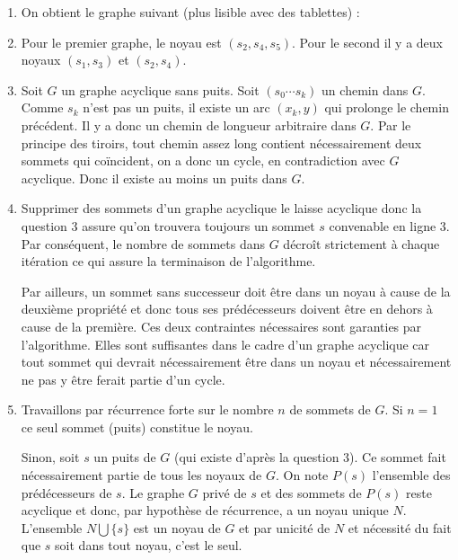 \documentclass{ccinp}
\begin{document}
\begin{enumerate}
\item On obtient le graphe suivant (plus lisible avec des tablettes) : 
\begin{center}
\end{center}

\item Pour le premier graphe, le noyau est $(s_2,s_4,s_5)$. Pour le second il y a deux noyaux $(s_1,s_3)$ et $(s_2,s_4)$.
\item Soit $G$ un graphe acyclique sans puits. Soit $(s_0\cdots s_k)$ un chemin dans $G$. Comme $s_k$ n'est pas un puits, il existe un arc $(x_k,y)$ qui prolonge le chemin précédent. Il y a donc un chemin de longueur arbitraire dans $G$. Par le principe des tiroirs, tout chemin assez long contient nécessairement deux sommets qui coïncident, on a donc un cycle, en contradiction avec $G$ acyclique. Donc il existe au moins un puits dans $G$.
\item Supprimer des sommets d'un graphe acyclique le laisse acyclique donc la question 3 assure qu'on trouvera toujours un sommet $s$ convenable en ligne 3. Par conséquent, le nombre de sommets dans $G$ décroît strictement à chaque itération ce qui assure la terminaison de l'algorithme.

Par ailleurs, un sommet sans successeur doit être dans un noyau à cause de la deuxième propriété et donc tous ses prédécesseurs doivent être en dehors à cause de la première. Ces deux contraintes nécessaires sont garanties par l'algorithme. Elles sont suffisantes dans le cadre d'un graphe acyclique car tout sommet qui devrait nécessairement être dans un noyau et nécessairement ne pas y être ferait partie d'un cycle.
\item Travaillons par récurrence forte sur le nombre $n$ de sommets de $G$. Si $n=1$ ce seul sommet (puits) constitue le noyau. 

Sinon, soit $s$ un puits de $G$ (qui existe d'après la question 3). Ce sommet fait nécessairement partie de tous les noyaux de $G$. On note $P(s)$ l'ensemble des prédécesseurs de $s$. Le graphe $G$ privé de $s$ et des sommets de $P(s)$ reste acyclique et donc, par hypothèse de récurrence, a un noyau unique $N$. L'ensemble $N\bigcup\{s\}$ est un noyau de $G$ et par unicité de $N$ et nécessité du fait que $s$ soit dans tout noyau, c'est le seul.


\end{enumerate}
\end{document}
